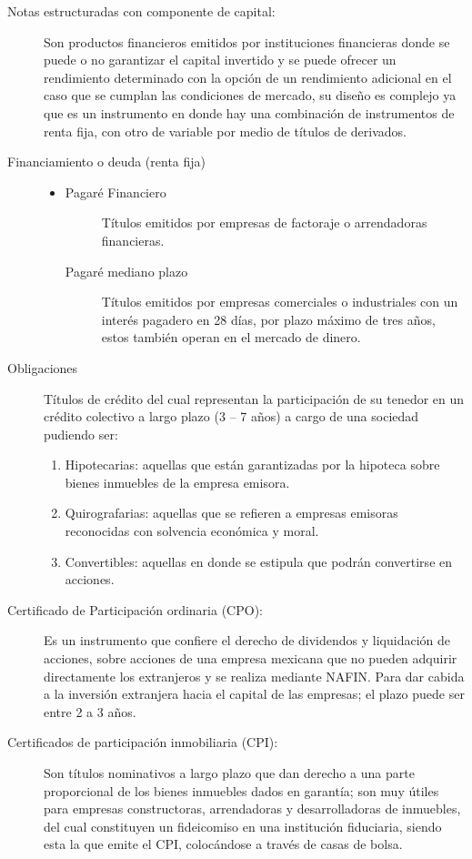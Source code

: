 \documentclass[10pt,letterpaper]{book}
\begin{document}
\begin{description}
    \item[Notas estructuradas con componente de capital:] \hfill \break Son productos financieros emitidos por instituciones financieras donde se puede o no garantizar el capital invertido y se puede ofrecer un rendimiento determinado con la opción de un rendimiento adicional en el caso que se cumplan las condiciones de mercado, su diseño es complejo ya que es un instrumento en donde hay una combinación de instrumentos de renta fija, con otro de variable por medio de títulos de derivados.
    \item[Financiamiento o deuda (renta fija)] \begin{itemize}
        \item \begin{description}
            \item[Pagaré Financiero] \hfill \break Títulos emitidos por empresas de factoraje o arrendadoras financieras.
            \item[Pagaré mediano plazo] \hfill \break Títulos emitidos por empresas comerciales o industriales con un interés pagadero en 28 días, por plazo máximo de tres años, estos también operan en el mercado de dinero.
        \end{description}    
    \end{itemize}
    \item[Obligaciones] \hfill \break Títulos de crédito del cual representan la participación de su tenedor en un crédito colectivo a largo plazo (3 – 7 años) a cargo de una sociedad pudiendo ser: \begin{enumerate}
        \item Hipotecarias: aquellas que están garantizadas por la hipoteca sobre bienes inmuebles de la empresa emisora.
        \item Quirografarias: aquellas que se refieren a empresas emisoras reconocidas con solvencia económica y moral.
        \item Convertibles: aquellas en donde se estipula que podrán convertirse en acciones.
    \end{enumerate}
    \item[Certificado de Participación ordinaria (CPO):] \hfill \break Es un instrumento que confiere el derecho de dividendos y liquidación de acciones, sobre acciones de una empresa mexicana que no pueden adquirir directamente los extranjeros y se realiza mediante NAFIN. Para dar cabida a la inversión extranjera hacia el capital de las empresas; el plazo puede ser entre 2 a 3 años.
    \item[Certificados de participación inmobiliaria (CPI):] \hfill \break Son títulos nominativos a largo plazo que dan derecho a una parte proporcional de los bienes inmuebles dados en garantía; son muy útiles para empresas constructoras, arrendadoras y desarrolladoras de inmuebles, del cual constituyen un fideicomiso en una institución fiduciaria, siendo esta la que emite el CPI, colocándose a través de casas de bolsa.

\end{description}
\end{document}
